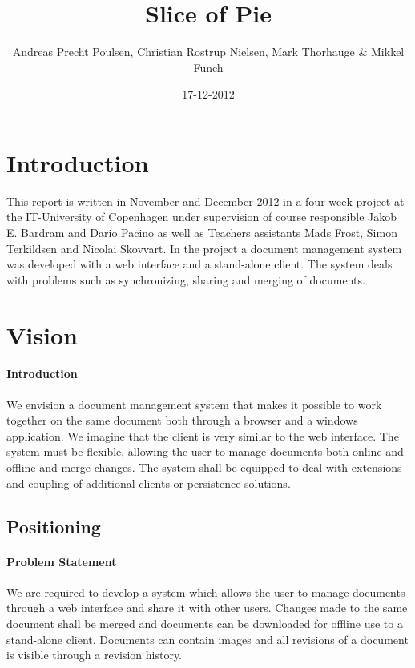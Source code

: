 \documentclass[a4paper,11pt,report]{report}
\begin{document}
\title{Slice of Pie}
\author{Andreas Precht Poulsen, Christian Rostrup Nielsen, Mark Thorhauge \& Mikkel Funch}
\date{17-12-2012}
\maketitle

\section{Introduction}
This report is written in November and December 2012 in a four-week project at the IT-University of Copenhagen under supervision of course responsible Jakob E. Bardram and Dario Pacino as well as Teachers assistants Mads Frost, Simon Terkildsen and Nicolai Skovvart. In the project a document management system was developed with a web interface and a stand-alone client. The system deals with problems such as synchronizing, sharing and merging of documents.

\tableofcontents
\listoffigures

\section{Vision}
\paragraph{Introduction}
We envision a document management system that makes it possible to work together on the same document both through a browser and a windows application. We imagine that the client is very similar to the web interface. The system must be flexible, allowing the user to manage documents both online and offline and merge changes. The system shall be equipped to deal with extensions and coupling of additional clients or persistence solutions. \\
\subsection{Positioning}
\paragraph{Problem Statement} 
We are required to develop a system which allows the user to manage documents through a web interface and share it with other users. Changes made to the same document shall be merged and documents can be downloaded for offline use to a stand-alone client. Documents can contain images and all revisions of a document is visible through a revision history.
\end{document}
